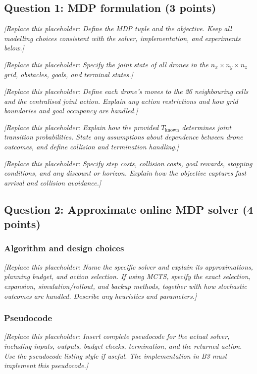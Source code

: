 \documentclass[11pt,a4paper]{article}
\newcommand{\placeholder}[1]{%
  \par\smallskip
  \noindent\textcolor{placeholderGray}{\textit{[Replace this placeholder: #1]}}
  \par\smallskip
}
\begin{document}
\subsection*{Question 1: MDP formulation (3 points)}
\label{sec:b1}
\placeholder{Define the MDP tuple and the objective. Keep all modelling
choices consistent with the solver, implementation, and experiments below.}
\begin{description}[leftmargin=1em,style=nextline]
  \item[State space $\mathcal{S}$ and initial state.]
    \placeholder{Specify the joint state of all drones in the
    $n_x\times n_y\times n_z$ grid, obstacles, goals, and terminal states.}
  \item[Action space $\mathcal{A}$.]
    \placeholder{Define each drone's moves to the 26 neighbouring cells and
    the centralised joint action. Explain any action restrictions and how
    grid boundaries and goal occupancy are handled.}
  \item[Transition function $T$.]
    \placeholder{Explain how the provided $T_{\mathrm{known}}$ determines
    joint transition probabilities. State any assumptions about dependence
    between drone outcomes, and define collision and termination handling.}
  \item[Reward, termination, and objective.]
    \placeholder{Specify step costs, collision costs, goal rewards, stopping
    conditions, and any discount or horizon. Explain how the objective
    captures fast arrival and collision avoidance.}
\end{description}

\subsection*{Question 2: Approximate online MDP solver (4 points)}
\label{sec:b2}
\subsubsection*{Algorithm and design choices}
\placeholder{Name the specific solver and explain its approximations,
planning budget, and action selection. If using MCTS, specify the exact
selection, expansion, simulation/rollout, and backup methods, together with
how stochastic outcomes are handled. Describe any heuristics and parameters.}

\subsubsection*{Pseudocode}
\placeholder{Insert complete pseudocode for the actual solver, including
inputs, outputs, budget checks, termination, and the returned action. Use the
pseudocode listing style if useful. The implementation
in B3 must implement this pseudocode.}
\end{document}
